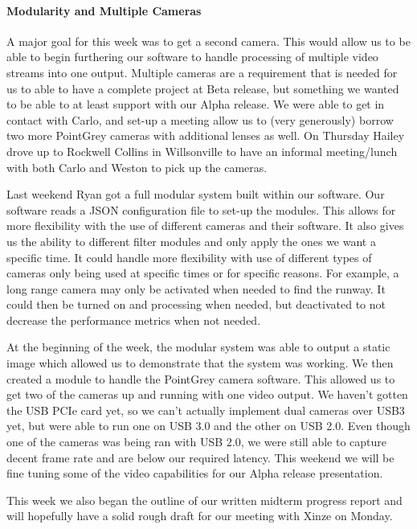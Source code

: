 \paragraph{Modularity and Multiple Cameras}
A major goal for this week was to get a second camera. This would allow us to be able to begin furthering our software to handle processing of multiple video streams into one output. Multiple cameras are a requirement that is needed for us to able to have a complete project at Beta release, but something we wanted to be able to at least support with our Alpha release. We were able to get in contact with Carlo, and set-up a meeting allow us to (very generously) borrow two more PointGrey cameras with additional lenses as well. On Thursday Hailey drove up to Rockwell Collins in Willsonville to have an informal meeting/lunch with both Carlo and Weston to pick up the cameras.
\par
Last weekend Ryan got a full modular system built within our software. Our software reads a JSON configuration file to set-up the modules. This allows for more flexibility with the use of different cameras and their software. It also gives us the ability to different filter modules and only apply the ones we want a specific time. It could handle more flexibility with use of different types of cameras only being used at specific times or for specific reasons. For example, a long range camera may only be activated when needed to find the runway. It could then be turned on and processing when needed, but deactivated to not decrease the performance metrics when not needed. 
\par
At the beginning of the week, the modular system was able to output a static image which allowed us to demonstrate that the system was working. We then created a module to handle the PointGrey camera software. This allowed us to get two of the cameras up and running with one video output. We haven't gotten the USB PCIe card yet, so we can't actually implement dual cameras over USB3 yet, but were able to run one on USB 3.0 and the other on USB 2.0. Even though one of the cameras was being ran with USB 2.0, we were still able to capture decent frame rate and are below our required latency. This weekend we will be fine tuning some of the video capabilities for our Alpha release presentation.
\par
This week we also began the outline of our written midterm progress report and will hopefully have a solid rough draft for our meeting with Xinze on Monday.\\

